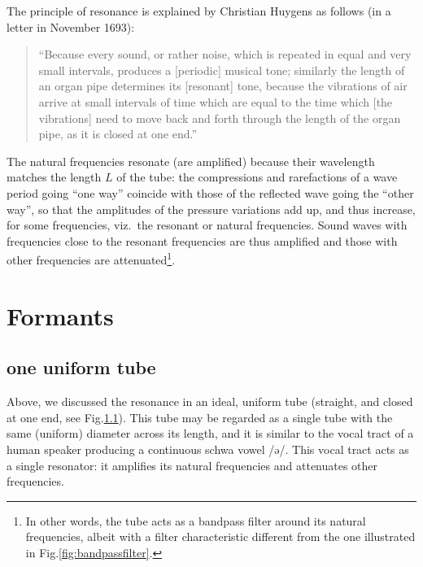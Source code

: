 \documentclass[
]{book}
\begin{document}
The principle of resonance is explained by Christian Huygens as follows (in a letter in November 1693):

\begin{quote}
``Because every sound, or rather noise, which is repeated in equal and very small intervals, produces a {[}periodic{]} musical tone; similarly the length of an organ pipe determines its {[}resonant{]} tone, because the vibrations of air arrive at small intervals of time which are equal to the time which {[}the vibrations{]} need to move back and forth through the length of the organ pipe, as it is closed at one end.'' \citep[571, transl. HQ]{Huygens_1905}
\end{quote}

The natural frequencies resonate (are amplified) because their wavelength matches the length \(L\) of the tube: the compressions and rarefactions of a wave period going ``one way'' coincide with those of the reflected wave going the ``other way'', so that the amplitudes of the pressure variations add up, and thus increase, for some frequencies, viz.~the resonant or natural frequencies. Sound waves with frequencies close to the resonant frequencies are thus amplified and those with other frequencies are attenuated\footnote{In other words, the tube acts as a bandpass filter around its natural frequencies, albeit with a filter characteristic different from the one illustrated in Fig.\ref{fig:bandpassfilter}.}.

\section{Formants}\label{sec:formants}

\subsection{one uniform tube}\label{sec:onetube}

Above, we discussed the resonance in an ideal, uniform tube (straight, and closed at one end, see Fig.\ref{sec:onetube}). This tube may be regarded as a single tube with the same (uniform) diameter across its length, and it is similar to the vocal tract of a human speaker producing a continuous schwa vowel /ə/. This vocal tract acts as a single resonator: it amplifies its natural frequencies and attenuates other frequencies.
\end{document}
